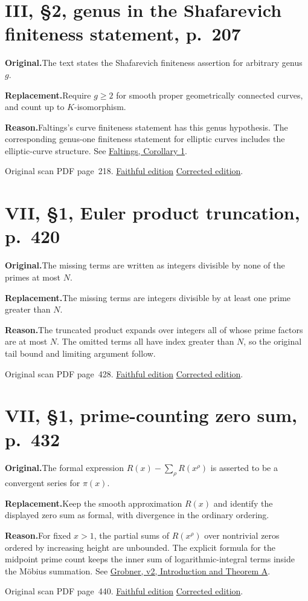 \documentclass[11pt,a4paper]{article}
\newcommand{\original}{\par\smallskip\noindent\textbf{Original.}\enspace}
\newcommand{\replacement}{\par\smallskip\noindent\textbf{Replacement.}\enspace}
\newcommand{\reason}{\par\smallskip\noindent\textbf{Reason.}\enspace}
\newcommand{\editionlink}[3]{\href{#1\#errata.#2}{#3}}
\newcommand{\location}[2]{%
  \par\smallskip\noindent Original scan PDF page~#2.\enspace
  \editionlink{Neukirch_Faithful.pdf}{#1}{Faithful edition}
  \quad\editionlink{Neukirch_Corrected.pdf}{#1}{Corrected edition}.}
\begin{document}
\setcounter{section}{175}
\section{III, \S2, genus in the Shafarevich finiteness statement, p.~207}\label{errata:item:176}

\original The text states the Shafarevich finiteness assertion for arbitrary genus $g$.
\replacement Require $g\ge2$ for smooth proper geometrically connected curves, and count up to $K$-isomorphism.
\reason Faltings\textquoteright{}s curve finiteness statement has this genus hypothesis. The corresponding genus-one finiteness statement for elliptic curves includes the elliptic-curve structure. See \href{https://math.uchicago.edu/~drinfeld/Deligne%27s_conjecture_Manin_conf/Faltings_argument/Faltings.pdf}{Faltings, Corollary 1}.
\location{176}{218}

\setcounter{section}{176}
\section{VII, \S1, Euler product truncation, p.~420}\label{errata:item:177}

\original The missing terms are written as integers divisible by none of the primes at most $N$.
\replacement The missing terms are integers divisible by at least one prime greater than $N$.
\reason The truncated product expands over integers all of whose prime factors are at most $N$. The omitted terms all have index greater than $N$, so the original tail bound and limiting argument follow.
\location{177}{428}

\setcounter{section}{177}
\section{VII, \S1, prime-counting zero sum, p.~432}\label{errata:item:178}

\original The formal expression $R(x)-\sum_\rho R(x^\rho)$ is asserted to be a convergent series for $\pi(x)$.
\replacement Keep the smooth approximation $R(x)$ and identify the displayed zero sum as formal, with divergence in the ordinary ordering.
\reason For fixed $x>1$, the partial sums of $R(x^\rho)$ over nontrivial zeros ordered by increasing height are unbounded. The explicit formula for the midpoint prime count keeps the inner sum of logarithmic-integral terms inside the Möbius summation. See \href{https://arxiv.org/abs/2609.02713v2}{Grobner, v2, Introduction and Theorem A}.
\location{178}{440}
\end{document}

